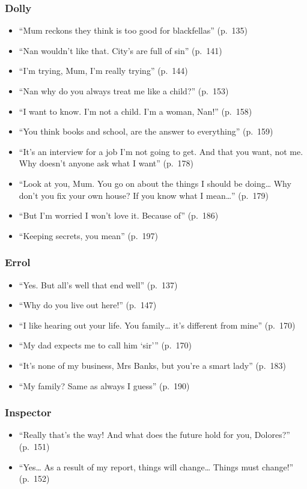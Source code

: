 \documentclass[a4paper]{article}
\begin{document}
\subsubsection{Dolly}
\begin{itemize}
    \item ``Mum reckons they think is too good for blackfellas'' (p.~135)
    \item ``Nan wouldn’t like that. City’s are full of sin'' (p.~141)
    \item ``I’m trying, Mum, I’m really trying'' (p.~144)
    \item ``Nan why do you always treat me like a child?'' (p.~153)
    \item ``I want to know. I’m not a child. I’m a woman, Nan!'' (p.~158)
    \item ``You think books and school, are the answer to everything'' (p.~159)
    \item ``It’s an interview for a job I’m not going to get. And that you want, not me. Why doesn’t anyone ask what I want'' (p.~178)
    \item ``Look at you, Mum. You go on about the things I should be doing… Why don’t you fix your own house? If you know what I mean…'' (p.~179)
    \item ``But I’m worried I won’t love it. Because of'' (p.~186)
    \item ``Keeping secrets, you mean'' (p.~197)
\end{itemize}

\subsubsection{Errol}
\begin{itemize}
    \item ``Yes. But all’s well that end well'' (p.~137)
    \item ``Why do you live out here!'' (p.~147)
    \item ``I like hearing out your life. You family… it’s different from mine'' (p.~170)
    \item ``My dad expects me to call him ‘sir’'' (p.~170)
    \item ``It’s none of my business, Mrs Banks, but you’re a smart lady'' (p.~183)
    \item ``My family? Same as always I guess'' (p.~190)
\end{itemize}

\subsubsection{Inspector}
\begin{itemize}
    \item ``Really that’s the way! And what does the future hold for you, Dolores?'' (p.~151)
    \item ``Yes… As a result of my report, things will change… Things must change!'' (p.~152)
\end{itemize}
\end{document}

